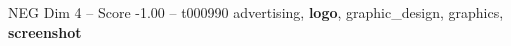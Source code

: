 \begin{textsample}{NEG Dim 4 – Score -1.00 – t000990}  \label{ex:f4_neg_015}
advertising, \textbf{logo}, graphic\_design, graphics, \textbf{screenshot}

\end{textsample}
